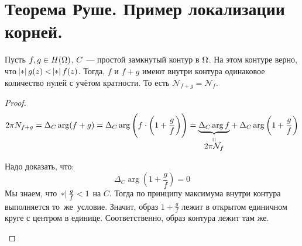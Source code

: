 \section{Теорема Руше. Пример локализации корней.}

\begin{theorem}[Руше]

    Пусть $f, g \in H(\Om)$,
    $C$~--- простой замкнутый контур в $\Om$.
    На этом контуре верно, что $\abs{g(z)} < \abs{f(z)}$.
    Тогда, $f$ и $f+g$ имеют внутри контура одинаковое количество
    нулей с учётом кратности. То есть $\mathcal{N}_{f+g} = \mathcal{N}_f$. 
\end{theorem}

\begin{proof}

    \[
        2\pi N_{f+g} = \Delta_C \arg(f+g)
        = \Delta_C \arg\left(f \cdot \left(1 + \frac{g}{f}\right)\right)
        = \stackbelow{\underbrace{\Delta_C \arg f}}{2\pi \mathcal{N}_f} + \Delta_C \arg \left(1 + \frac{g}{f}\right)
    \]

    Надо доказать, что:
    $$\Delta_C \arg \left(1 + \frac gf\right) = 0$$
    Мы знаем, что $\abs{\frac gf} < 1$ на $C$. Тогда по принципу максимума внутри контура выполняется то~же~условие. Значит, образ $1 + \frac{g}{f}$ лежит в открытом единичном круге с центром в единице. Соответственно, образ контура лежит там же. 
    \begin{center}

        \begin{tikzpicture}[x=0.75pt,y=0.75pt,yscale=-1,xscale=1]


\end{tikzpicture}
\end{center}
\end{proof}
